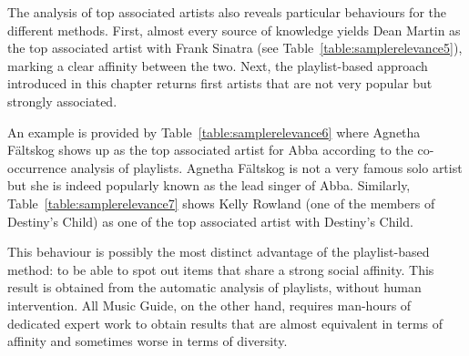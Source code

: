 The analysis of top associated artists also reveals particular behaviours for the different methods.
First, almost every source of knowledge yields Dean Martin as the top associated artist with Frank Sinatra (see Table~\ref{table:samplerelevance5}), marking a clear affinity between the two.
Next, the playlist-based approach introduced in this chapter returns first artists that are not very popular but strongly associated.

An example is provided by Table~\ref{table:samplerelevance6} where Agnetha F\"{a}ltskog shows up as the top associated artist for Abba according to the co-occurrence analysis of playlists. 
Agnetha F\"{a}ltskog is not a very famous solo artist but she is indeed popularly known as the lead singer of Abba.
Similarly, Table~\ref{table:samplerelevance7} shows Kelly Rowland (one of the members of Destiny's Child) as one of the top associated artist with Destiny's Child.

This behaviour is possibly the most distinct advantage of the playlist-based method: to be able to spot out items that share a strong social affinity. %
This result is obtained from the automatic analysis of playlists, without human intervention.
All Music Guide, on the other hand, requires man-hours of dedicated expert work to obtain results that are almost equivalent in terms of affinity and sometimes worse in terms of diversity.

